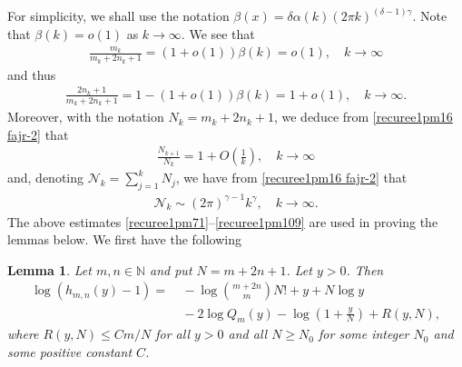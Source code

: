 \documentclass[12pt]{amsart}
\numberwithin{equation}{section}
\newtheorem{lemma}[theorem]{Lemma}
\begin{document}
For simplicity, we shall use the notation $\beta(x)=\delta\alpha(k)(2\pi k)^{(\delta-1)\gamma}$. Note that $\beta(k)=o(1)$ as $k\to\infty$. We see that
\begin{equation}\label{recuree1pm71}
\begin{split}
\frac{m_k}{m_k+2n_k+1}=(1+o(1))\beta(k)=o(1), \quad k\to\infty
\end{split}
\end{equation}
and thus
\begin{equation}\label{recuree1pm72}
\begin{split}
\frac{2n_k+1}{m_k+2n_k+1}=1-(1+o(1))\beta(k)=1+o(1), \quad k\to\infty.
\end{split}
\end{equation}
Moreover, with the notation $N_k=m_k+2n_k+1$, we deduce from \eqref{recuree1pm16  fajr-2} that
\begin{equation}\label{recuree1pm73}
\begin{split}
\frac{N_{k+1}}{N_k}=1+O\left(\frac{1}{k}\right), \quad k\to\infty
\end{split}
\end{equation}
and, denoting $\mathcal{N}_k=\sum_{j=1}^{k}N_j$, we have from \eqref{recuree1pm16  fajr-2} that
\begin{equation}\label{recuree1pm109}
\begin{split}
\mathcal{N}_{k}\sim (2\pi)^{\gamma-1}k^{\gamma}, \quad k\to\infty.
\end{split}
\end{equation}
The above estimates \eqref{recuree1pm71}--\eqref{recuree1pm109} are used in proving the lemmas below. We first have the following

\begin{lemma}\label{Lemma3}
Let $m,n\in \mathbb{N}$ and put $N=m+2n+1$. Let $y>0$. Then
\begin{equation}\label{recuree1pm24}
\begin{split}
\log(h_{m,n}(y)-1)=&\ -\log \binom{m+2n}{m} N!+y+N\log y\\
&\ -2\log Q_m(y)-\log\left(1+\frac{y}{N}\right)+R(y,N),
\end{split}
\end{equation}
where $R(y,N)\leq Cm/N$ for all $y>0$ and all $N\geq N_0$ for some integer $N_0$ and some positive constant $C$.
\end{lemma}
\end{document}
